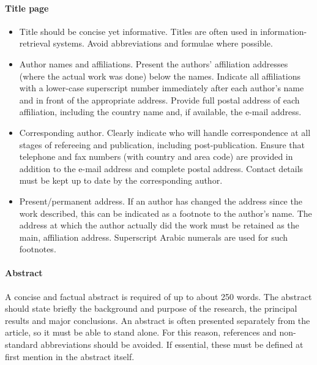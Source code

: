 \paragraph{Title page}
\begin{itemize}
\item Title should be concise yet informative. Titles are often used in information-retrieval systems. Avoid abbreviations and formulae where possible.
\item Author names and affiliations. Present the authors' affiliation addresses (where the actual work was done) below the names. Indicate all affiliations with a lower-case superscript number immediately after each author's name and in front of the appropriate address. Provide full postal address of each affiliation, including the country name and, if available, the e-mail address.
\item Corresponding author. Clearly indicate who will handle correspondence at all stages of refereeing and publication, including post-publication. Ensure that telephone and fax numbers (with country and area code) are provided in addition to the e-mail address and complete postal address. Contact details must be kept up to date by the corresponding author.
\item Present/permanent address. If an author has changed the address since the work described, this can be indicated as a footnote to the author's name. The address at which the author actually did the work must be retained as the main, affiliation address. Superscript Arabic numerals are used for such footnotes.
\end{itemize}

\paragraph{Abstract}

A concise and factual abstract is required of up to about 250 words. The abstract should state briefly the background and purpose of the research, the principal results and major conclusions. An abstract is often presented separately from the article, so it must be able to stand alone. For this reason, references and non-standard abbreviations should be avoided. If essential, these must be defined  at first mention in the abstract itself.
%
%
%
%

